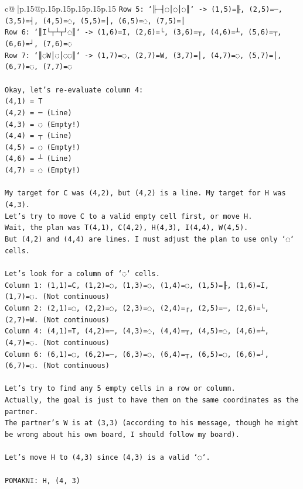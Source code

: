 \documentclass{article}
\begin{document}
{\begin{supertabular}{c@{$\;$}|p{.15\linewidth}@{}p{.15\linewidth}p{.15\linewidth}p{.15\linewidth}p{.15\linewidth}p{.15\linewidth}}
{{{\texttt{Row 5: `╟─┤◌│◌│◌║` {-}> (1,5)=╟, (2,5)=─, (3,5)=┤, (4,5)=◌, (5,5)=│, (6,5)=◌, (7,5)=│} \\
\texttt{Row 6: `║I└┬┴┬┘◌║` {-}> (1,6)=I, (2,6)=└, (3,6)=┬, (4,6)=┴, (5,6)=┬, (6,6)=┘, (7,6)=◌} \\
\texttt{Row 7: `║◌W│◌│◌◌║` {-}> (1,7)=◌, (2,7)=W, (3,7)=│, (4,7)=◌, (5,7)=│, (6,7)=◌, (7,7)=◌} \\
\\ 
\texttt{Okay, let's re{-}evaluate column 4:} \\
\texttt{(4,1) = T} \\
\texttt{(4,2) = ─ (Line)} \\
\texttt{(4,3) = ◌ (Empty!)} \\
\texttt{(4,4) = ┬ (Line)} \\
\texttt{(4,5) = ◌ (Empty!)} \\
\texttt{(4,6) = ┴ (Line)} \\
\texttt{(4,7) = ◌ (Empty!)} \\
\\ 
\texttt{My target for C was (4,2), but (4,2) is a line. My target for H was (4,3).} \\
\texttt{Let's try to move C to a valid empty cell first, or move H.} \\
\texttt{Wait, the plan was T(4,1), C(4,2), H(4,3), I(4,4), W(4,5).} \\
\texttt{But (4,2) and (4,4) are lines. I must adjust the plan to use only `◌` cells.} \\
\\ 
\texttt{Let's look for a column of `◌` cells.} \\
\texttt{Column 1: (1,1)=C, (1,2)=◌, (1,3)=◌, (1,4)=◌, (1,5)=╟, (1,6)=I, (1,7)=◌. (Not continuous)} \\
\texttt{Column 2: (2,1)=◌, (2,2)=◌, (2,3)=◌, (2,4)=┌, (2,5)=─, (2,6)=└, (2,7)=W. (Not continuous)} \\
\texttt{Column 4: (4,1)=T, (4,2)=─, (4,3)=◌, (4,4)=┬, (4,5)=◌, (4,6)=┴, (4,7)=◌. (Not continuous)} \\
\texttt{Column 6: (6,1)=◌, (6,2)=─, (6,3)=◌, (6,4)=┬, (6,5)=◌, (6,6)=┘, (6,7)=◌. (Not continuous)} \\
\\ 
\texttt{Let's try to find any 5 empty cells in a row or column.} \\
\texttt{Actually, the goal is just to have them on the same coordinates as the partner.} \\
\texttt{The partner's W is at (3,3) (according to his message, though he might be wrong about his own board, I should follow my board).} \\
\\ 
\texttt{Let's move H to (4,3) since (4,3) is a valid `◌`.} \\
\\ 
\texttt{POMAKNI: H, (4, 3)} \\
            }
        }
    }
     \\ \\


\end{supertabular}}
\end{document}
